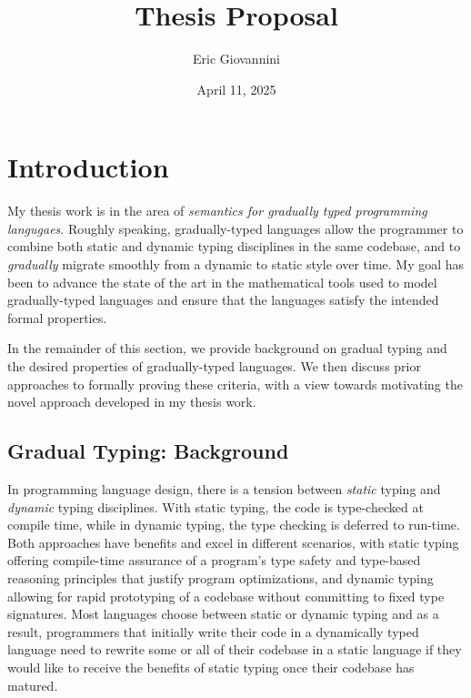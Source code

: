 \documentclass{article}
\theoremstyle{definition}
\theoremstyle{remark}
\begin{document}

\title{Thesis Proposal}
\author{Eric Giovannini}
\date{April 11, 2025}

\maketitle

\tableofcontents

\section{Introduction}

My thesis work is in the area of \emph{semantics for gradually typed programming
langugaes}. Roughly speaking, gradually-typed languages allow the programmer to
combine both static and dynamic typing disciplines in the same codebase, and to
\emph{gradually} migrate smoothly from a dynamic to static style over time. My
goal has been to advance the state of the art in the mathematical tools used to
model gradually-typed languages and ensure that the languages satisfy the
intended formal properties.
%

In the remainder of this section, we provide background on gradual typing and
the desired properties of gradually-typed languages. We then discuss prior
approaches to formally proving these criteria, with a view towards motivating
the novel approach developed in my thesis work.

\subsection{Gradual Typing: Background}\label{sec:background-gradual-typing}

In programming language design, there is a tension between \emph{static} typing
and \emph{dynamic} typing disciplines. With static typing, the code is
type-checked at compile time, while in dynamic typing, the type checking is
deferred to run-time. Both approaches have benefits and excel in different
scenarios, with static typing offering compile-time assurance of a program's
type safety and type-based reasoning principles that justify program
optimizations, and dynamic typing allowing for rapid prototyping of a codebase
without committing to fixed type signatures.
%
Most languages choose between static or dynamic typing and as a result,
programmers that initially write their code in a dynamically typed language need
to rewrite some or all of their codebase in a static language if they would like
to receive the benefits of static typing once their codebase has matured.
\end{document}
